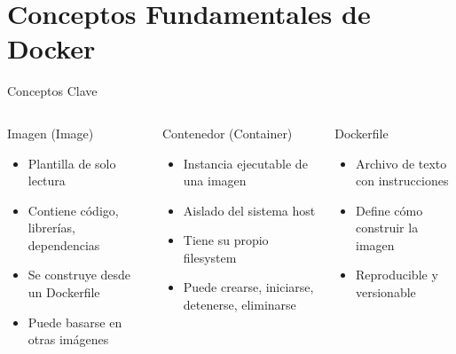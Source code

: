 \documentclass[aspectratio=169]{beamer}
\begin{document}
\section{Conceptos Fundamentales de Docker}

\begin{frame}{Conceptos Clave}
    \begin{columns}[t]
        \begin{block}{Imagen (Image)}
            \begin{itemize}
                \item Plantilla de solo lectura
                \item Contiene código, librerías, dependencias
                \item Se construye desde un Dockerfile
                \item Puede basarse en otras imágenes
            \end{itemize}
        \end{block}
        
        \begin{block}{Contenedor (Container)}
            \begin{itemize}
                \item Instancia ejecutable de una imagen
                \item Aislado del sistema host
                \item Tiene su propio filesystem
                \item Puede crearse, iniciarse, detenerse, eliminarse
            \end{itemize}
        \end{block}
        
        \begin{block}{Dockerfile}
            \begin{itemize}
                \item Archivo de texto con instrucciones
                \item Define cómo construir la imagen
                \item Reproducible y versionable
            \end{itemize}
        \end{block}
        

\end{columns}
\end{frame}
\end{document}

